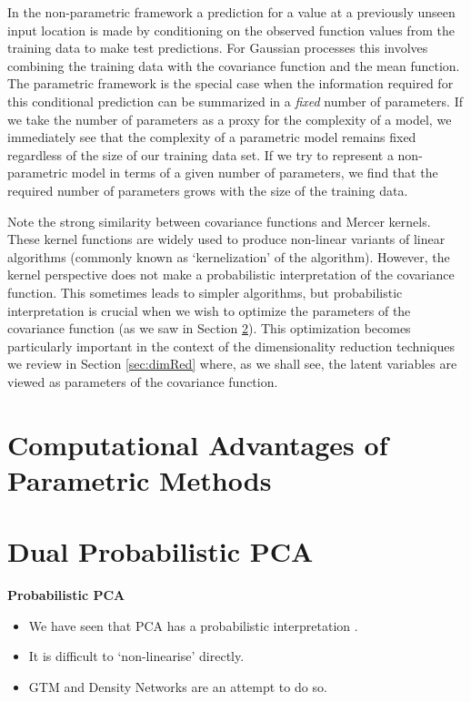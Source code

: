 In the non-parametric framework a prediction for a value at a
previously unseen input location is made by conditioning on the
observed function values from the training data to make test
predictions. For Gaussian processes this involves combining the
training data with the covariance function and the mean function. The
parametric framework is the special case when the information required
for this conditional prediction can be summarized in a \emph{fixed}
number of parameters. If we take the number of parameters as a proxy
for the complexity of a model, we immediately see that the complexity
of a parametric model remains fixed regardless of the size of our
training data set. If we try to represent a non-parametric model in
terms of a given number of parameters, we find that the required
number of parameters grows with the size of the training data.

Note the strong similarity between covariance functions and Mercer
kernels. These kernel functions are widely used to produce non-linear
variants of linear algorithms (commonly known as `kernelization' of
the algorithm). However, the kernel perspective does not make a
probabilistic interpretation of the covariance function. This
sometimes leads to simpler algorithms, but probabilistic
interpretation is crucial when we wish to optimize the parameters of
the covariance function (as we saw in Section \ref{}). This
optimization becomes particularly important in the context of the
dimensionality reduction techniques we review in Section
\ref{sec:dimRed} where, as we shall see, the latent variables are
viewed as parameters of the covariance function.

\section{Computational Advantages of Parametric Methods}




\section{Dual Probabilistic PCA}


\textbf{Probabilistic PCA}
\begin{itemize}
\item We have seen that PCA has a probabilistic interpretation \cite{Tipping:probpca99}.
\item It is difficult to `non-linearise' directly.
\item GTM and Density Networks are an attempt to do so.
\end{itemize}
~


